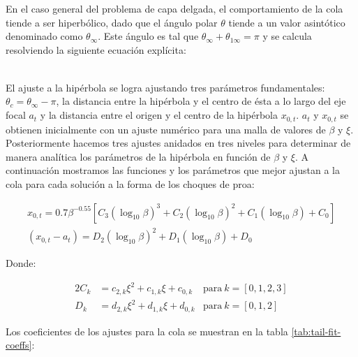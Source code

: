  En el caso general del problema de capa delgada, el comportamiento de la cola tiende a ser hiperbólico, dado que
 el ángulo polar $\theta$ tiende a un valor asintótico denominado como $\theta_\infty$. Este ángulo es tal que
 $\theta_\infty + \theta_{1\infty} = \pi$ y se calcula resolviendo la siguiente ecuación explícita:

 \begin{align}
   
 \end{align}

 El ajuste a la hipérbola se logra ajustando tres parámetros fundamentales: $\theta_c = \theta_\infty - \pi$,
 la distancia entre la hipérbola y el centro de ésta a lo largo del eje focal $a_t$ y la distancia entre el origen
 y el centro de la hipérbola $x_{0,t}$. $a_t$ y $x_{0,t}$ se obtienen inicialmente con un ajuste numérico para una
 malla de valores de $\beta$ y $\xi$. Posteriormente hacemos tres ajustes anidados en tres niveles para determinar
 de manera analítica los parámetros de la hipérbola en función de $\beta$ y $\xi$. A continuación mostramos las
 funciones y los parámetros que mejor ajustan a la cola para cada solución a la forma de los choques de proa:

 \begin{align}
   x_{0,t} = 0.7\beta^{-0.55}\left[C_3\left(\log_{10}\beta\right)^3 + C_2\left(\log_{10}\beta\right)^2 +
   C_1\left(\log_{10}\beta\right) + C_0\right] \label{eq:tail-analytic-x0}\\
   (x_{0,t} - a_t) = D_2\left(\log_{10}\beta\right)^2 + D_1\left(\log_{10}\beta\right) + D_0
   \label{eq:tail-analytic-x0-minus-a}
 \end{align}

 Donde:
 
 \begin{alignat}{2}
   \label{eq:tail-analytic-coeffs-c}
   C_k &= c_{2,k}\xi^2 + c_{1,k}\xi + c_{0,k} & \mathrm{para~}k=[0,1,2,3] \\
   \label{eq:tail-analytic-coeffs-d}
   D_k &= d_{2,k}\xi^2 + d_{1,k}\xi + d_{0,k} & \mathrm{para~}k=[0,1,2]
 \end{alignat}

 Los coeficientes de los ajustes para la cola se muestran en la tabla \ref{tab:tail-fit-coeffs}:


\newcommand\iso{\ensuremath{^{\mathrm{iso}}}}

